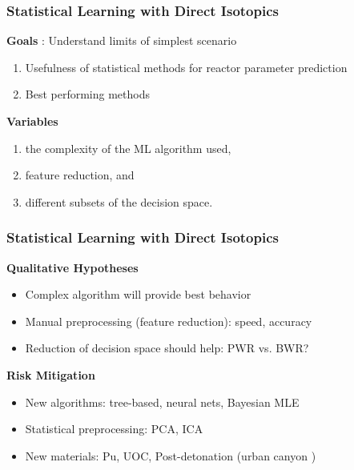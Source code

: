 
\begin{frame}
  \frametitle{Statistical Learning with Direct Isotopics}
  \textbf{Goals} : Understand limits of simplest scenario
  \begin{enumerate}
    \item Usefulness of statistical methods for reactor parameter prediction
    \item Best performing methods
  \end{enumerate}

  \textbf{Variables}
  \begin{enumerate}
    \item the complexity of the ML algorithm used, 
    \item feature reduction, and 
    \item different subsets of the decision space.
  \end{enumerate}
\end{frame}

\begin{frame}
  \frametitle{Statistical Learning with Direct Isotopics}
  \textbf{Qualitative Hypotheses}
  \begin{itemize}
    \item Complex algorithm will provide best behavior
    \item Manual preprocessing (feature reduction): speed, accuracy
    \item Reduction of decision space should help: PWR vs. BWR?
  \end{itemize}

  \textbf{Risk Mitigation}
  \begin{itemize}
    \item New algorithms: tree-based, neural nets, Bayesian MLE
    \item Statistical preprocessing: PCA, ICA
    \item New materials: Pu, UOC, Post-detonation (urban canyon \cite{refmaterial})
  \end{itemize}
\end{frame}

